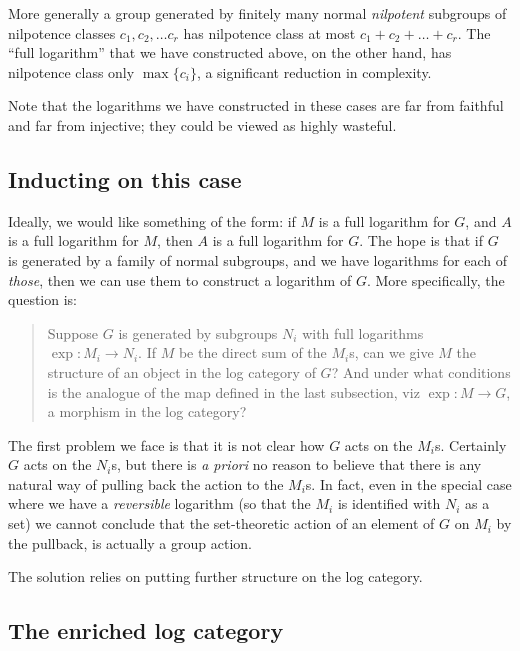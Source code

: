 \documentclass[a4paper]{amsart}
\begin{document}
More generally a group generated by finitely many normal {\em
  nilpotent} subgroups of nilpotence classes $c_1, c_2, \ldots c_r$
has nilpotence class at most $c_1 + c_2 + \ldots + c_r$. The ``full
logarithm'' that we have constructed above, on the other hand, has
nilpotence class only $\max \{ c_i \}$, a significant reduction in
complexity. 

Note that the logarithms we have constructed in these cases are far
from faithful and far from injective; they could be viewed as highly
wasteful.
\subsection{Inducting on this case}

Ideally, we would like something of the form: if $M$ is a full
logarithm for $G$, and $A$ is a full logarithm for $M$, then $A$ is a
full logarithm for $G$. The hope is that if $G$ is generated by a
family of normal subgroups, and we have logarithms for each of {\em
  those}, then we can use them to construct a logarithm of $G$. More
specifically, the question is:

\begin{quote}
  Suppose $G$ is generated by subgroups $N_i$ with full logarithms
  $\exp:M_i \to N_i$. If $M$ be the direct sum of the $M_i$s, can we
  give $M$ the structure of an object in the log category of $G$? And
  under what conditions is the analogue of the map defined in the last
  subsection, viz $\exp:M \to G$, a morphism in the log category?
\end{quote}

The first problem we face is that it is not clear how $G$ acts on the
$M_i$s. Certainly $G$ acts on the $N_i$s, but there is {\em a priori}
no reason to believe that there is any natural way of pulling back the
action to the $M_i$s. In fact, even in the special case where we have
a {\em reversible} logarithm (so that the $M_i$ is identified with
$N_i$ as a set) we cannot conclude that the set-theoretic action of an
element of $G$ on $M_i$ by the pullback, is actually a group action. 

The solution relies on putting further structure on the log category.

\subsection{The enriched log category}
\end{document}
